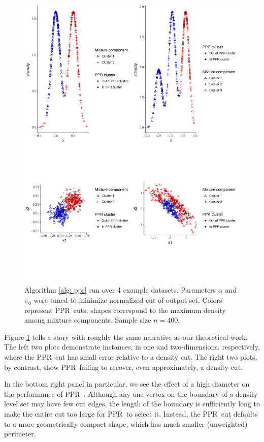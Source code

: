 \documentclass{article}
\newcommand{\1}{\mathbf{1}}
\newcommand{\pprspace}{{\sc PPR~}}
\theoremstyle{aldenthm}
\theoremstyle{aldenrmrk}
\begin{document}
\begin{figure}[ht]
	\vskip 0.2in
	\begin{center}
	\centerline{\includegraphics[width=\columnwidth]{graphic_1}}
	\caption{Algorithm \ref{alg: ppr} run over 4 example datasets. Parameters $\alpha$ and $\pi_0$ were tuned to minimize normalized cut of output set. Colors represent \pprspace cuts; shapes correspond to the maximum density among mixture components. Sample size $n = 400$.}
	\label{fig: graphic_1}
	\end{center}
	\vskip 0.2in
\end{figure}

Figure \ref{fig: graphic_1} tells a story with roughly the same narrative as our theoretical work. The left two plots demonstrate instances, in one and two-dimensions, respectively, where the \pprspace cut has small error relative to a density cut. The right two plots, by contrast, show \pprspace failing to recover, even approximately, a density cut. 

In the bottom right panel in particular, we see the effect of a high diameter on the performance of \pprspace. Although any one vertex on the boundary of a density level set may have few cut edges, the length of the boundary is sufficiently long to make the entire cut too large for \pprspace to select it. Instead, the \pprspace cut defaults to a more geometrically compact shape, which has much smaller (unweighted) perimeter. 
\end{document}
